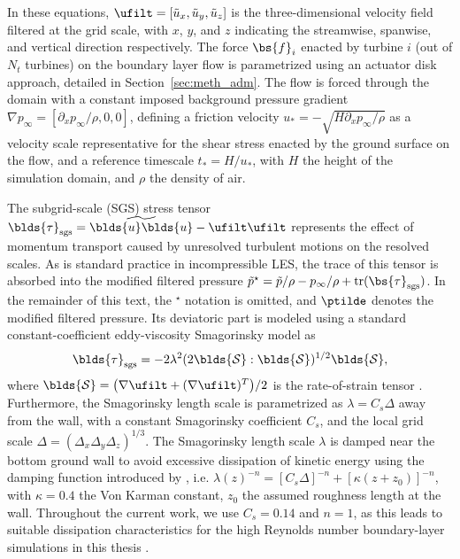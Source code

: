 In these equations, $\ufilt = [\tilde{u}_x, \tilde{u}_y, \tilde{u}_z]$ is the three-dimensional velocity field filtered at the grid scale, with $x$, $y$, and $z$ indicating the streamwise, spanwise, and vertical direction respectively. The force $\bs{f}_i$ enacted by turbine $i$ (out of $N_t$ turbines) on the boundary layer flow is parametrized using an actuator disk approach, detailed in Section~\ref{sec:meth_adm}. The flow is forced through the domain with a constant imposed background pressure gradient $\nabla p_\infty = [\partial_x p_\infty/\rho, 0, 0]$, defining a friction velocity $u_* = - \sqrt{H \partial_x p_\infty/\rho}$ as a velocity scale representative for the shear stress enacted by the ground surface on the flow, and a reference timescale $t_* = H/u_*$, with $H$ the height of the simulation domain, and $\rho$ the density of air. 

The subgrid-scale (SGS) stress tensor $\blds{\tau}_{\text{sgs}} = \widetilde{\blds{u} \blds{u}} - \ufilt \ufilt$ represents the effect of momentum transport caused by unresolved turbulent motions on the resolved scales. As is standard practice in incompressible LES, the trace of this tensor is absorbed into the modified filtered pressure $\tilde{p}^\star = \tilde{p}/\rho - p_\infty / \rho + \text{tr}(\bs{\tau}_\text{sgs})$. In the remainder of this text, the $^\star$ notation is omitted, and $\ptilde$ denotes the modified filtered pressure. Its deviatoric part is modeled using a standard constant-coefficient eddy-viscosity Smagorinsky model as 
\begin{equation}
	\blds{\tau}_{\text{sgs}} = - 2 \lambda^2 (2 \blds{\mathcal{S}} : \blds{\mathcal{S}})^{1/2} \blds{\mathcal{S}},
\end{equation}
where $\blds{\mathcal{S}} = \big(\nabla \ufilt + (\nabla \ufilt)^T \big)/2$ is the rate-of-strain tensor \citep{smagorinsky1963general}. Furthermore, the Smagorinsky length scale is parametrized as $\lambda = C_s \Delta$ away from the wall, with a constant Smagorinsky coefficient $C_s$, and the local grid scale $\Delta = (\Delta_x \Delta_y \Delta_z)^{1/3}$. The Smagorinsky length scale $\lambda$ is damped near the bottom ground wall to avoid excessive dissipation of kinetic energy using the damping function introduced by \cite{mason1992stochastic}, i.e. $\lambda(z)^{-n} = [C_s \Delta]^{-n} + [\kappa (z + z_0)]^{-n}$, with $\kappa = 0.4$ the Von Karman constant, $z_0$ the assumed roughness length at the wall. Throughout the current work, we use $C_s = 0.14$ and $n = 1$, as this leads to suitable dissipation characteristics for the high Reynolds number boundary-layer simulations in this thesis \citep{meyers2011error}.

